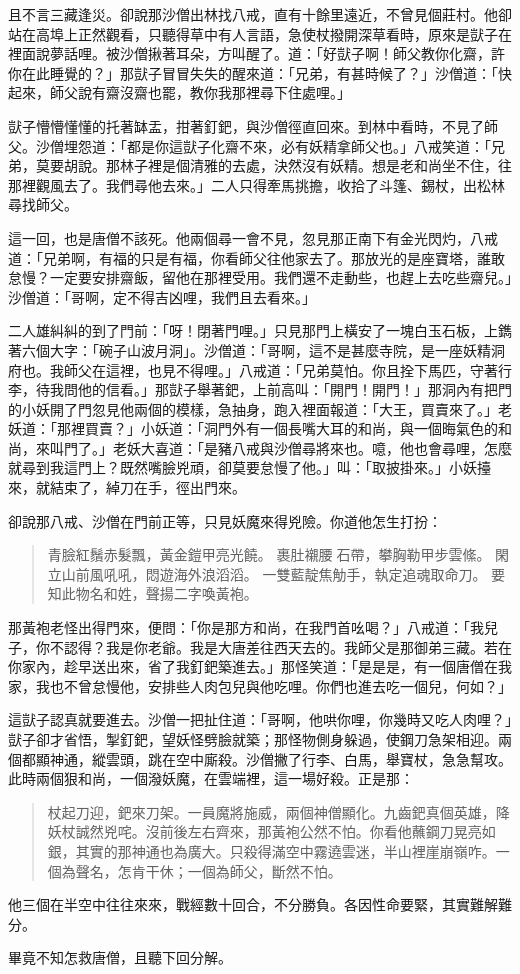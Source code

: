 且不言三藏逢災。卻說那沙僧出林找八戒，直有十餘里遠近，不曾見個莊村。他卻站在高埠上正然觀看，只聽得草中有人言語，急使杖撥開深草看時，原來是獃子在裡面說夢話哩。被沙僧揪著耳朵，方叫醒了。道：「好獃子啊！師父教你化齋，許你在此睡覺的？」那獃子冒冒失失的醒來道：「兄弟，有甚時候了？」沙僧道：「快起來，師父說有齋沒齋也罷，教你我那裡尋下住處哩。」

獃子懵懵懂懂的托著缽盂，拑著釘鈀，與沙僧徑直回來。到林中看時，不見了師父。沙僧埋怨道：「都是你這獃子化齋不來，必有妖精拿師父也。」八戒笑道：「兄弟，莫要胡說。那林子裡是個清雅的去處，決然沒有妖精。想是老和尚坐不住，往那裡觀風去了。我們尋他去來。」二人只得牽馬挑擔，收拾了斗篷、錫杖，出松林尋找師父。

這一回，也是唐僧不該死。他兩個尋一會不見，忽見那正南下有金光閃灼，八戒道：「兄弟啊，有福的只是有福，你看師父往他家去了。那放光的是座寶塔，誰敢怠慢？一定要安排齋飯，留他在那裡受用。我們還不走動些，也趕上去吃些齋兒。」沙僧道：「哥啊，定不得吉凶哩，我們且去看來。」

二人雄糾糾的到了門前：「呀！閉著門哩。」只見那門上橫安了一塊白玉石板，上鐫著六個大字：「碗子山波月洞」。沙僧道：「哥啊，這不是甚麼寺院，是一座妖精洞府也。我師父在這裡，也見不得哩。」八戒道：「兄弟莫怕。你且拴下馬匹，守著行李，待我問他的信看。」那獃子舉著鈀，上前高叫：「開門！開門！」那洞內有把門的小妖開了門忽見他兩個的模樣，急抽身，跑入裡面報道：「大王，買賣來了。」老妖道：「那裡買賣？」小妖道：「洞門外有一個長嘴大耳的和尚，與一個晦氣色的和尚，來叫門了。」老妖大喜道：「是豬八戒與沙僧尋將來也。噫，他也會尋哩，怎麼就尋到我這門上？既然嘴臉兇頑，卻莫要怠慢了他。」叫：「取披掛來。」小妖擡來，就結束了，綽刀在手，徑出門來。

卻說那八戒、沙僧在門前正等，只見妖魔來得兇險。你道他怎生打扮：
\begin{quote}
青臉紅鬚赤髮飄，黃金鎧甲亮光饒。
裹肚襯腰𥓼石帶，攀胸勒甲步雲絛。
閑立山前風吼吼，悶遊海外浪滔滔。
一雙藍靛焦觔手，執定追魂取命刀。
要知此物名和姓，聲揚二字喚黃袍。
\end{quote}

那黃袍老怪出得門來，便問：「你是那方和尚，在我門首吆喝？」八戒道：「我兒子，你不認得？我是你老爺。我是大唐差往西天去的。我師父是那御弟三藏。若在你家內，趁早送出來，省了我釘鈀築進去。」那怪笑道：「是是是，有一個唐僧在我家，我也不曾怠慢他，安排些人肉包兒與他吃哩。你們也進去吃一個兒，何如？」

這獃子認真就要進去。沙僧一把扯住道：「哥啊，他哄你哩，你幾時又吃人肉哩？」獃子卻才省悟，掣釘鈀，望妖怪劈臉就築；那怪物側身躲過，使鋼刀急架相迎。兩個都顯神通，縱雲頭，跳在空中廝殺。沙僧撇了行李、白馬，舉寶杖，急急幫攻。此時兩個狠和尚，一個潑妖魔，在雲端裡，這一場好殺。正是那：
\begin{quote}
杖起刀迎，鈀來刀架。一員魔將施威，兩個神僧顯化。九齒鈀真個英雄，降妖杖誠然兇咤。沒前後左右齊來，那黃袍公然不怕。你看他蘸鋼刀晃亮如銀，其實的那神通也為廣大。只殺得滿空中霧遶雲迷，半山裡崖崩嶺咋。一個為聲名，怎肯干休；一個為師父，斷然不怕。
\end{quote}

他三個在半空中往往來來，戰經數十回合，不分勝負。各因性命要緊，其實難解難分。

畢竟不知怎救唐僧，且聽下回分解。
